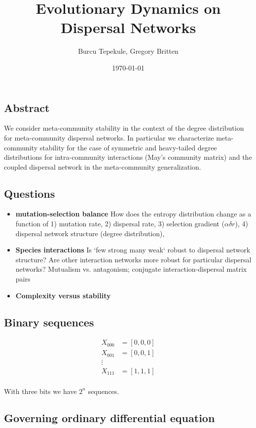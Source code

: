 \documentclass[12pt]{article}
\title{Evolutionary Dynamics on Dispersal Networks}
\author{\small{Burcu Tepekule, Gregory Britten}}
\date{\small{\printdayoff\today}}
\begin{document}
\maketitle 

\subsection*{Abstract}
We consider meta-community stability in the context of the degree distribution for meta-community dispersal networks. In particular we characterize meta-community stability for the case of symmetric and heavy-tailed degree distributions for intra-community interactions (May's community matrix) and the coupled dispersal network in the meta-community generalization. 

\subsection*{Questions}

\begin{itemize}
\item \textbf{mutation-selection balance} How does the entropy distribution change as a function of 1) mutation rate, 2) dispersal rate, 3) selection gradient ($\alpha\delta r$), 4) dispersal network structure (degree distribution), 

\item \textbf{Species interactions} Is `few strong many weak` robust to dispersal network structure? Are other interaction networks more robust for particular dispersal networks? Mutualism vs. antagonism; conjugate interaction-dispersal matrix pairs
\item \textbf{Complexity versus stability}
\end{itemize}

\subsection*{Binary sequences}
\begin{align*}
X_{000} &= [0,0,0]\\
X_{001} &= [0,0,1]\\
\vdots \\
X_{111} &= [1,1,1]\\
\end{align*}

With three bits we have $2^n$ sequences.


\subsection*{Governing ordinary differential equation}
\end{document}
